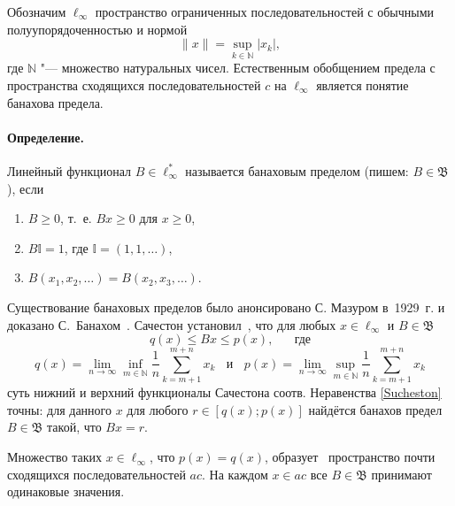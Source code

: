 
\vzmscaption


Обозначим $\ell_\infty$ пространство ограниченных последовательностей с обычными полуупорядоченностью и нормой
\begin{equation*}
	\|x\| = \sup_{k\in\mathbb{N}} |x_k|
	,
\end{equation*}
где $\mathbb{N}$ "--- множество натуральных чисел.
Естественным обобщением предела с пространства сходящихся последовательностей $c$ на $\ell_\infty$
является понятие банахова предела.


\paragraph{Определение.}
	Линейный функционал $B\in \ell_\infty^*$ называется банаховым пределом
	(пишем: $B \in \mathfrak{B}$),
	если
	\begin{enumerate}
		\item
			$B\geq0$, т.~е. $Bx \geq 0$ для $x \geq 0$,
		\item
			$B\mathbb{I}=1$, где $\mathbb{I} =(1,1,\ldots)$,
		\item
			$B(x_1,x_2,\ldots)=B(x_2,x_3,\ldots)$.
	\end{enumerate}

Существование банаховых пределов было анонсировано С. Мазуром в~1929~г. и доказано С.~Банахом~\cite{banach1993theorie}.
%
Сачестон установил~\cite{sucheston1967banach}, что
для любых $x\in \ell_\infty$ и $B\in\mathfrak{B}$
\begin{equation}\label{Sucheston}
	q(x) \leqslant Bx \leqslant p(x)
	,
	\quad\mbox{~~где}
\end{equation}
\begin{equation*}
	q(x) = \lim_{n\to\infty} \inf_{m\in\mathbb{N}}  \frac{1}{n} \sum_{k=m+1}^{m+n} x_k
	~~~~\mbox{и}~~~~
	p(x) = \lim_{n\to\infty} \sup_{m\in\mathbb{N}}  \frac{1}{n} \sum_{k=m+1}^{m+n} x_k
\end{equation*}
суть нижний и верхний функционалы Сачестона соотв.
Неравенства \eqref{Sucheston} точны:
для данного $x$ для любого $r\in[q(x); p(x)]$ найдётся банахов предел
$B\in\mathfrak{B}$ такой, что $Bx = r$.

Множество таких $x\in\ell_\infty$, что $p(x)=q(x)$,
образует~\cite{lorentz1948contribution} пространство почти сходящихся последовательностей $ac$.
На каждом $x\in ac$ все $B\in \mathfrak{B}$ принимают одинаковые значения.




